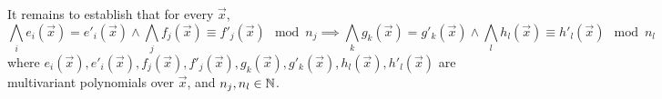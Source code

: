 
It remains to establish that for every $\vec{x}$,
\[
  \bigwedge\limits_i e_i (\vec{x}) = e'_i (\vec{x}) \wedge
  \bigwedge\limits_j f_j (\vec{x}) \equiv f'_j (\vec{x}) \mod n_j
  \implies
  \bigwedge\limits_k g_k (\vec{x}) = g'_k (\vec{x}) \wedge
  \bigwedge\limits_l   h_l (\vec{x}) \equiv h'_l (\vec{x}) \mod n_l
\]
where
$e_i (\vec{x}), e'_i (\vec{x}), f_j (\vec{x}), f'_j (\vec{x}),
 g_k (\vec{x}), g'_k (\vec{x}), h_l (\vec{x}), h'_l (\vec{x})$
are multivariant polynomials over $\vec{x}$, and
$n_j, n_l \in \mathbb{N} $.